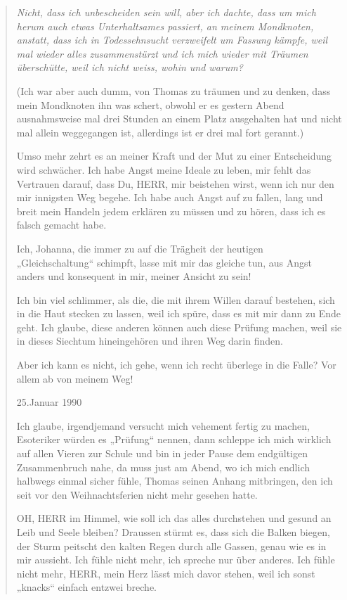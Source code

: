 \documentclass[10pt,a5paper]{book}
\newenvironment{tg}{\begin{quote}\em}{\end{quote}}
\begin{document}
\begin{tg}
Nicht, dass ich unbescheiden sein will, aber ich dachte, dass um mich herum auch etwas Unterhaltsames passiert, an meinem Mondknoten, anstatt, dass ich in Todessehnsucht verzweifelt um Fassung kämpfe, weil mal wieder alles zusammenstürzt und ich mich wieder mit Träumen überschütte, weil ich nicht weiss, wohin und warum?

(Ich war aber auch dumm, von Thomas zu träumen und zu denken, dass mein Mondknoten ihn was schert, obwohl er es gestern Abend ausnahmsweise mal drei Stunden an einem Platz ausgehalten hat und nicht mal allein weggegangen ist, allerdings ist er drei mal fort gerannt.)

Umso mehr zehrt es an meiner Kraft und der Mut zu einer Entscheidung wird schwächer. Ich habe Angst meine Ideale zu leben, mir fehlt das Vertrauen darauf, dass Du, HERR, mir beistehen wirst, wenn ich nur den mir innigsten Weg begehe.  Ich habe auch Angst auf zu fallen, lang und breit mein Handeln jedem erklären zu müssen und zu hören, dass ich es falsch gemacht habe.

Ich, Johanna, die immer zu auf die Trägheit der heutigen „Gleichschaltung“ schimpft, lasse mit mir das gleiche tun, aus Angst anders und konsequent in mir, meiner Ansicht zu sein!

Ich bin viel schlimmer, als die, die mit ihrem Willen darauf bestehen, sich in die Haut stecken zu lassen, weil ich spüre, dass es mit mir dann zu Ende geht. Ich glaube, diese anderen können auch diese Prüfung machen, weil sie in dieses Siechtum hineingehören und ihren Weg darin finden.

Aber ich kann es nicht, ich gehe, wenn ich recht überlege in die Falle?
Vor allem ab von meinem Weg!

25.Januar 1990

Ich glaube, irgendjemand versucht mich vehement fertig zu machen, Esoteriker würden es „Prüfung“ nennen, dann schleppe ich mich wirklich auf allen Vieren zur Schule und bin in jeder Pause dem endgültigen Zusammenbruch nahe, da muss just am Abend, wo ich mich endlich halbwegs einmal sicher fühle, Thomas seinen Anhang mitbringen, den ich seit vor den Weihnachtsferien nicht mehr gesehen hatte.

OH, HERR im Himmel, wie soll ich das alles durchstehen und gesund an Leib und Seele bleiben? Draussen stürmt es, dass sich die Balken biegen, der Sturm peitscht den kalten Regen durch alle Gassen, genau wie es in mir aussieht. Ich fühle nicht mehr, ich spreche nur über anderes.  Ich fühle nicht mehr, HERR, mein Herz lässt mich davor stehen, weil ich sonst „knacks“ einfach entzwei breche.


\end{tg}
\end{document}
